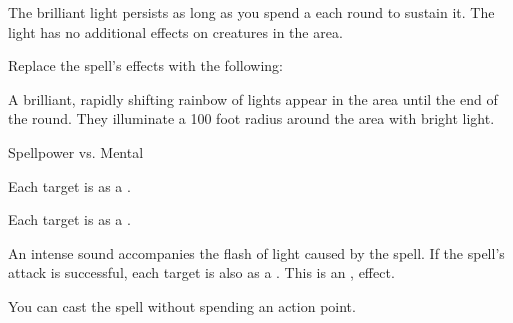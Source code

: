 
The brilliant light persists as long as you spend a  each round to sustain it.
The light has no additional effects on creatures in the area.









Replace the spell's effects with the following:
\begin{spellcontent}

\begin{augmenteffects}



\spelleffect
A brilliant, rapidly shifting rainbow of lights appear in the area until the end of the round.
They illuminate a 100 foot radius around the area with bright light.




\begin{spellattack}{Spellpower vs. Mental}


\spellsuccess
Each target is \disoriented as a .



\spellcritical
Each target is \confused as a .



\end{spellattack}





\end{augmenteffects}

\end{spellcontent}






An intense sound accompanies the flash of light caused by the spell.
If the spell's attack is successful, each target is also \deafened as a .
This is an ,  effect.






You can cast the spell without spending an action point.




